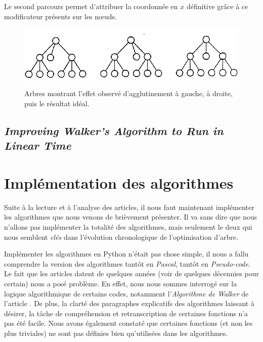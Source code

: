 \documentclass{article}
\begin{document}
  Le second parcours permet d'attribuer la coordonnée en $x$ définitive grâce à ce modificateur présents sur les n\oe{}uds.
  
   \vfill
  \begin{figure}[h]
    \begin{center}
        \includegraphics[scale=0.5]{arbreWalker.png}
    \end{center}
    \caption{Arbres montrant l'effet observé d'agglutinement à gauche, à droite, puis le résultat idéal.
	\cite{article90}}
  \label{fig:arbresAlgoWS}
\end{figure}
\vfill
  
  
  \subsection{\emph{Improving Walker’s Algorithm to Run in Linear Time}}
  
  

\newpage
\section{Implémentation des algorithmes}

Suite à la lecture et à l'analyse des articles, il nous faut maintenant implémenter les algorithmes que nous venons de brièvement présenter. Il va sans dire que nous n'allons pas implémenter la totalité des algorithmes, mais seulement le deux qui nous semblent \emph{clés} dans l'évolution chronologique de l'optimisation d'arbre.

Implémenter les algorithmes en Python n'était pas chose simple, il nous a fallu comprendre la version des algorithmes tantôt en \emph{Pascal}, tantôt en \emph{Pseudo-code}. Le fait que les articles datent de quelques années (voir de quelques décennies pour certain) nous a posé problème. En effet, nous nous sommes interrogé sur la logique algorithmique de certains codes, notamment l'\emph{Algorithme de Walker} de l'article \cite{article90}. De plus, la clarté des paragraphes explicatifs des algorithmes laissant à désirer, la tâche de compréhension et retranscription de certaines fonctions n'a pas été facile. Nous avons également constaté que certaines fonctions (et non les plus triviales) ne sont pas définies bien qu'utilisées dans les algorithmes. 
\end{document}
